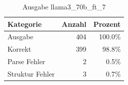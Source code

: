 
\begin{table}[!ht]
\centering
\begin{tabular}{lrr}
\toprule
\textbf{Kategorie} & \textbf{Anzahl} & \textbf{Prozent} \\
\midrule
Ausgabe & 404 & 100.0\% \\
Korrekt & 399 & 98.8\% \\
Parse Fehler & 2 & 0.5\% \\
Struktur Fehler & 3 & 0.7\% \\
\bottomrule
\end{tabular}
\caption{Ausgabe llama3_70b_ft_7}
\label{tab:file_counts}
\end{table}
    